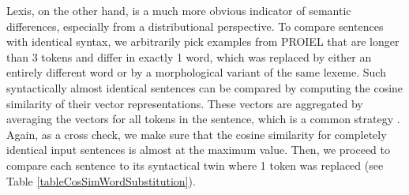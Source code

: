 Lexis, on the other hand, is a much more obvious indicator of semantic differences, especially from a distributional perspective. To compare sentences with identical syntax, we arbitrarily pick examples from PROIEL that are longer than 3 tokens and differ in exactly 1 word, which was replaced by either an entirely different word or by a morphological variant of the same lexeme. Such syntactically almost identical sentences can be compared by computing the cosine similarity of their vector representations. These vectors are aggregated by averaging the vectors for all tokens in the sentence, which is a common strategy \parencite[1]{adiFinegrainedAnalysisSentence2016}. Again, as a cross check, we make sure that the cosine similarity for completely identical input sentences is almost at the maximum value. Then, we proceed to compare each sentence to its syntactical twin where 1 token was replaced (see Table \ref{tableCosSimWordSubstitution}).
